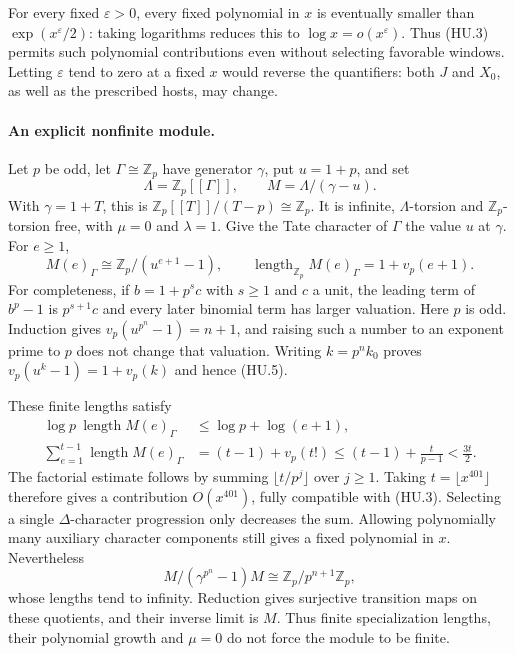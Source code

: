 For every fixed $\varepsilon>0$, every fixed polynomial in $x$
is eventually smaller than $\exp(x^\varepsilon/2)$: taking
logarithms reduces this to $\log x=o(x^\varepsilon)$.
Thus (HU.3) permits such polynomial contributions even without
selecting favorable windows.  Letting $\varepsilon$ tend to zero
at a fixed $x$ would reverse the quantifiers: both $J$ and $X_0$,
as well as the prescribed hosts, may change.

\paragraph{An explicit nonfinite module.}
Let $p$ be odd, let $\Gamma\cong\mathbb Z_p$ have generator $\gamma$,
put $u=1+p$, and set
\[
 \Lambda=\mathbb Z_p[[\Gamma]],\qquad
 M=\Lambda/(\gamma-u).
 \tag{HU.4}
\]
With $\gamma=1+T$, this is
$\mathbb Z_p[[T]]/(T-p)\cong\mathbb Z_p$.
It is infinite, $\Lambda$-torsion and $\mathbb Z_p$-torsion free,
with $\mu=0$ and $\lambda=1$.
Give the Tate character of $\Gamma$ the value $u$ at $\gamma$.
For $e\ge1$,
\[
 M(e)_\Gamma\cong
       \mathbb Z_p/(u^{e+1}-1),\qquad
 \operatorname{length}_{\mathbb Z_p}M(e)_\Gamma
       =1+v_p(e+1).
 \tag{HU.5}
\]
For completeness, if $b=1+p^s c$ with $s\ge1$ and $c$ a unit,
the leading term of $b^p-1$ is $p^{s+1}c$ and every later
binomial term has larger valuation.  Here $p$ is odd.
Induction gives $v_p(u^{p^n}-1)=n+1$, and raising such a number
to an exponent prime to $p$ does not change that valuation.
Writing $k=p^nk_0$ proves
$v_p(u^k-1)=1+v_p(k)$ and hence (HU.5).

These finite lengths satisfy
\[
 \begin{split}
 \log p\ \operatorname{length}M(e)_\Gamma
     &\le \log p+\log(e+1),\\
 \sum_{e=1}^{t-1}\operatorname{length}M(e)_\Gamma
     &=(t-1)+v_p(t!)
       \le (t-1)+\frac{t}{p-1}<\frac{3t}{2}.
 \end{split}
 \tag{HU.6}
\]
The factorial estimate follows by summing
$\lfloor t/p^j\rfloor$ over $j\ge1$.
Taking $t=\lfloor x^{401}\rfloor$ therefore gives a contribution
$O(x^{401})$, fully compatible with (HU.3).
Selecting a single $\Delta$-character progression only decreases
the sum.  Allowing polynomially many auxiliary character components
still gives a fixed polynomial in $x$.
Nevertheless
\[
 M/(\gamma^{p^n}-1)M\cong\mathbb Z_p/p^{n+1}\mathbb Z_p,
 \tag{HU.7}
\]
whose lengths tend to infinity.  Reduction gives surjective
transition maps on these quotients, and their inverse limit is $M$.
Thus finite specialization lengths, their polynomial growth and
$\mu=0$ do not force the module to be finite.

